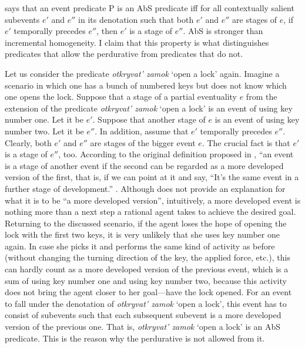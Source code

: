 \documentclass[output=paper,
]{langscibook}
\begin{document}
\noindent {} says that an event predicate P is an AbS predicate iff for all contextually salient subevents $e'$ and $e''$ in its denotation such that both $e'$ and $e''$ are stages of $e$, if $e'$ temporally precedes $e''$, then $e'$ is a stage of $e''$. AbS is stronger than incremental homogeneity. I claim that this property is what distinguishes predicates that allow the perdurative from predicates that do not. 

Let us consider the predicate \textit{otkryvat’ zamok} `open a lock' again. Imagine a scenario in which one has a bunch of numbered keys but does not know which one opens the lock. Suppose that a stage of a partial eventuality $e$ from the extension of the predicate \textit{otkryvat’ zamok} `open a lock' is an event of using key number one. Let it be $e'$. Suppose that another stage of $e$ is an event of using key number two. Let it be $e''$. In addition, assume that $e'$ temporally precedes $e''$. Clearly, both $e'$ and $e''$ are stages of the bigger event $e$. The crucial fact is that $e'$ is a stage of $e''$, too. According to the original definition proposed in \citet{landman1992progressive}, ``an event is a stage of another event if the second can be regarded as a more developed version of the first, that is, if we can point at it and say, ``It's the same event in a further stage of development.'' \citep[23]{landman1992progressive}. Although \citet{landman1992progressive} does not provide an explanation for what it is to be ``a more developed version'', intuitively, a more developed event is nothing more than a next step a rational agent takes to achieve the desired goal. Returning to the discussed scenario, if the agent loses the hope of opening the lock with the first two keys, it is very unlikely that she uses key number one again. In case she picks it and performs the same kind of activity as before (without changing the turning direction of the key, the applied force, etc.), this can hardly count as a more developed version of the previous event, which is a sum of using key number one and using key number two, because this activity does not bring the agent closer to her goal—have the lock opened. For an event to fall under the denotation of \textit{otkryvat’ zamok} `open a lock', this event has to consist of subevents such that each subsequent subevent is a more developed version of the previous one. That is, \textit{otkryvat’ zamok} `open a lock' is an AbS predicate. This is the reason why the perdurative is not allowed from it.
\end{document}
